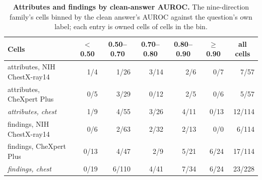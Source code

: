 \begin{table}[t]
\centering
\small
\setlength{\tabcolsep}{4pt}
\caption{\textbf{Attributes and findings by clean-answer AUROC.} The nine-direction family's cells binned by the clean answer's AUROC against the question's own label; each entry is owned cells of cells in the bin.}
\label{tab:cf-attr-strat}
\begin{tabular}{lrrrrrr}
\toprule
Cells & \multicolumn{1}{c}{$<$ 0.50} & \multicolumn{1}{c}{0.50--0.70} & \multicolumn{1}{c}{0.70--0.80} & \multicolumn{1}{c}{0.80--0.90} & \multicolumn{1}{c}{$\geq$ 0.90} & \multicolumn{1}{c}{all cells}\\
\midrule
attributes, NIH ChestX-ray14 & 1/4 & 1/26 & 3/14 & 2/6 & 0/7 & 7/57 \\
attributes, CheXpert Plus & 0/5 & 3/29 & 0/12 & 2/5 & 0/6 & 5/57 \\
\textit{attributes, chest} & 1/9 & 4/55 & 3/26 & 4/11 & 0/13 & 12/114 \\
findings, NIH ChestX-ray14 & 0/6 & 2/63 & 2/32 & 2/13 & 0/0 & 6/114 \\
findings, CheXpert Plus & 0/13 & 4/47 & 2/9 & 5/21 & 6/24 & 17/114 \\
\textit{findings, chest} & 0/19 & 6/110 & 4/41 & 7/34 & 6/24 & 23/228 \\
\bottomrule
\end{tabular}
\end{table}

